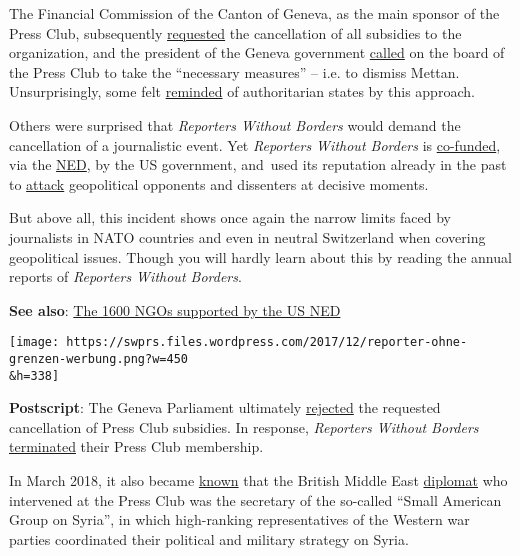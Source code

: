 The Financial Commission of the Canton of Geneva, as the main sponsor of
the Press Club, subse­quently
\href{https://www.letemps.ch/suisse/2017/12/01/coup-semonce-contre-club-suisse-presse}{requested}
the cancellation of all subsidies to the organization, and the president
of the Geneva government
\href{https://www.letemps.ch/monde/2017/11/28/club-suisse-presse-tourmente-syrienne}{called}
on the board of the Press Club to take the ``necessary measures'' --
i.e. to dismiss Mettan. Unsurprisingly, some felt
\href{https://www.tdg.ch/geneve/actu-genevoise/club-suisse-presse-perd-100-000-francs/story/11699535}{reminded}
of authoritarian states by this approach.

Others were surprised that \emph{Reporters Without Borders} would demand
the cancellation of a journalistic event. Yet \emph{Reporters Without
Borders} is
\href{https://en.wikipedia.org/wiki/Reporters_Without_Borders\#Funding}{co-funded},
via the \href{http://www.voltairenet.org/article192992.html}{NED}, by
the US government, and~used its reputation already in the past to
\href{http://www.voltairenet.org/article165297.html}{attack}
geopolitical opponents and dissenters at decisive moments.

But above all, this incident shows once again the narrow limits faced by
journalists in NATO countries and even in neutral Switzerland when
covering geopolitical issues. Though you will hardly learn about this by
reading the annual reports of \emph{Reporters Without Borders}.

\textbf{See also}:
\href{https://swprs.org/organizations-funded-by-the-ned/}{The 1600 NGOs
supported by the US NED}

\texttt{[image: https://swprs.files.wordpress.com/2017/12/reporter-ohne-grenzen-werbung.png?w=450\\\&h=338]}

\textbf{Postscript}: The Geneva Parliament ultimately
\href{https://www.letemps.ch/suisse/2017/12/15/club-suisse-presse-garde-subvention}{rejected}
the requested cancellation of Press Club subsidies. In response,
\emph{Reporters Without Borders}
\href{https://www.letemps.ch/monde/2017/12/20/une-premiere-defection-club-suisse-presse}{terminated}
their Press Club membership.

In March 2018, it also became
\href{https://www.rubikon.news/artikel/die-geplante-zerschlagung-syriens}{known}
that the British Middle East
\href{https://twitter.com/BenJarlath/status/932644417944604672}{diplomat}
who intervened at the Press Club was the secretary of the so-called
``Small American Group on Syria'', in which high-ranking representatives
of the Western war parties coordinated their political and military
strategy on Syria.


